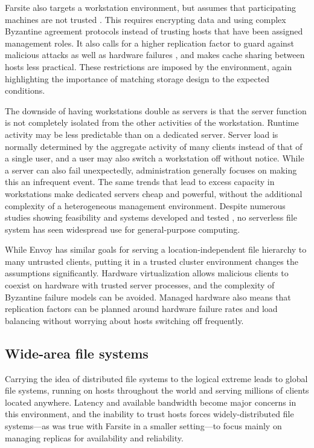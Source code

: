 Farsite also targets a workstation environment, but assumes that participating machines are not trusted \cite{adya}. This requires encrypting data and using complex Byzantine agreement protocols instead of trusting hosts that have been assigned management roles. It also calls for a higher replication factor to guard against malicious attacks as well as hardware failures \cite{dahlin94a}, and makes cache sharing between hosts less practical. These restrictions are imposed by the environment, again highlighting the importance of matching storage design to the expected conditions.

The downside of having workstations double as servers is that the server function is not completely isolated from the other activities of the workstation. Runtime activity may be less predictable than on a dedicated server. Server load is normally determined by the aggregate activity of many clients instead of that of a single user, and a user may also switch a workstation off without notice. While a server can also fail unexpectedly, administration generally focuses on making this an infrequent event. The same trends that lead to excess capacity in workstations make dedicated servers cheap and powerful, without the additional complexity of a heterogeneous management environment. Despite numerous studies \cite{bolosky,douceur99,douceur01} showing feasibility and systems developed and tested \cite{adya,walker}, no serverless file system has seen widespread use for general-purpose computing.

While Envoy has similar goals for serving a location-independent file hierarchy to many untrusted clients, putting it in a trusted cluster environment changes the assumptions significantly. Hardware virtualization allows malicious clients to coexist on hardware with trusted server processes, and the complexity of Byzantine failure models can be avoided. Managed hardware also means that replication factors can be planned around hardware failure rates and load balancing without worrying about hosts switching off frequently.

\subsection{Wide-area file systems}

Carrying the idea of distributed file systems to the logical extreme leads to global file systems, running on hosts throughout the world and serving millions of clients located anywhere. Latency and available bandwidth become major concerns in this environment, and the inability to trust hosts forces widely-distributed file systems---as was true with Farsite in a smaller setting---to focus mainly on managing replicas for availability and reliability.

